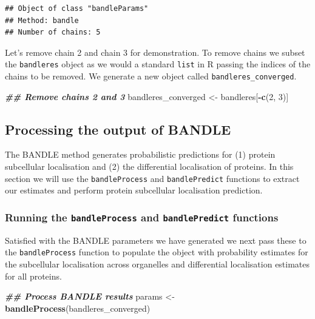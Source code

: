 \documentclass[9pt,a4paper,]{extarticle}
\newenvironment{Shaded}{\begin{snugshade}}{\end{snugshade}}
\newcommand{\DecValTok}[1]{\textcolor[rgb]{0.00,0.00,0.81}{#1}}
\newcommand{\DocumentationTok}[1]{\textcolor[rgb]{0.56,0.35,0.01}{\textbf{\textit{#1}}}}
\newcommand{\FunctionTok}[1]{\textcolor[rgb]{0.13,0.29,0.53}{\textbf{#1}}}
\newcommand{\NormalTok}[1]{#1}
\newcommand{\OtherTok}[1]{\textcolor[rgb]{0.56,0.35,0.01}{#1}}
\newcommand{\SpecialCharTok}[1]{\textcolor[rgb]{0.81,0.36,0.00}{\textbf{#1}}}
\begin{document}
\begin{verbatim}
## Object of class "bandleParams"
## Method: bandle 
## Number of chains: 5
\end{verbatim}

Let's remove chain 2 and chain 3 for demonstration. To remove chains we subset
the \texttt{bandleres} object as we would a standard \texttt{list} in R passing the indices of
the chains to be removed. We generate a new object called \texttt{bandleres\_converged}.

\begin{Shaded}
\begin{Highlighting}[]
\DocumentationTok{\#\# Remove chains 2 and 3}
\NormalTok{bandleres\_converged }\OtherTok{\textless{}{-}}\NormalTok{ bandleres[}\SpecialCharTok{{-}}\FunctionTok{c}\NormalTok{(}\DecValTok{2}\NormalTok{, }\DecValTok{3}\NormalTok{)]}
\end{Highlighting}
\end{Shaded}

\subsection{Processing the output of BANDLE}\label{processing-the-output-of-bandle}

The BANDLE method generates probabilistic predictions for (1) protein
subcellular localisation and (2) the differential localisation of proteins. In
this section we will use the \texttt{bandleProcess} and \texttt{bandlePredict} functions to
extract our estimates and perform protein subcellular localisation prediction.

\subsubsection{\texorpdfstring{Running the \texttt{bandleProcess} and \texttt{bandlePredict} functions}{Running the bandleProcess and bandlePredict functions}}\label{running-the-bandleprocess-and-bandlepredict-functions}

Satisfied with the BANDLE parameters we have generated we next pass these to
the \texttt{bandleProcess} function to populate the object with probability estimates
for the subcellular localisation across organelles and differential localisation
estimates for all proteins.

\begin{Shaded}
\begin{Highlighting}[]
\DocumentationTok{\#\# Process BANDLE results}
\NormalTok{params }\OtherTok{\textless{}{-}} \FunctionTok{bandleProcess}\NormalTok{(bandleres\_converged)}
\end{Highlighting}
\end{Shaded}
\end{document}
